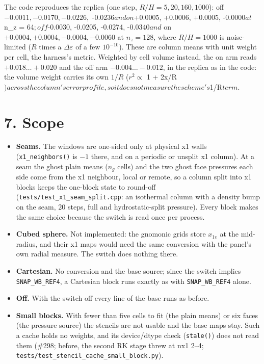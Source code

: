 \documentclass[11pt,a4paper]{article}
\begin{document}
The code reproduces the replica (one step, $R/H = 5, 20, 160, 1000$): off $-0.0011, -0.0170, -0.0226,$
-0.0236$ and on $+0.0005, +0.0006, +0.0005, -0.0000$ at $n\_z = 64$; off $-0.0030, -0.0205, -0.0274, -0.0340$ and$
on $+0.0004, +0.0004, -0.0004, -0.0060$ at $n_z = 128$, where $R/H = 1000$ is noise-limited ($R$ times a
$\Delta\varepsilon$ of a few $10^{-10}$). These are column means with unit weight per cell, the harness's
metric. Weighted by cell volume instead, the on arm reads $+0.018 \ldots +0.020$ and the off arm
$-0.004 \ldots -0.012$, in the replica as in the code: the volume weight carries its own $1/R$ ($r^2 \propto$
1 + 2x/R$) across the column's error profile, so it does not measure the scheme's $1/R$ term.$

\section*{7. Scope}

\begin{itemize}
\item \textbf{Seams.} The windows are one-sided only at physical x1 walls (\texttt{x1\_neighbors()} is $-1$ there, and on a
  periodic or unsplit x1 column). At a seam the ghost plain means ($n_g$ cells) and the two ghost face
  pressures each side come from the x1 neighbour, local or remote, so a column split into x1 blocks keeps the
  one-block state to round-off (\texttt{tests/test\_x1\_seam\_split.cpp}: an isothermal column with a density bump on
  the seam, 20 steps, full and hydrostatic-split pressure). Every block makes the same choice because the
  switch is read once per process.
\item \textbf{Cubed sphere.} Not implemented: the gnomonic grids store $x_{1v}$ at the mid-radius, and their x1 maps
  would need the same conversion with the panel's own radial measure. The switch does nothing there.
\item \textbf{Cartesian.} No conversion and the base source; since the switch implies \texttt{SNAP\_WB\_REF4}, a Cartesian block
  runs exactly as with \texttt{SNAP\_WB\_REF4} alone.
\item \textbf{Off.} With the switch off every line of the base runs as before.
\item \textbf{Small blocks.} With fewer than five cells to fit (the plain means) or six faces (the pressure source) the
  stencils are not usable and the base maps stay. Such a cache holds no weights, and its device/dtype check
  (\texttt{stale()}) does not read them (\#298; before, the second RK stage threw at nx1 2–4;
  \texttt{tests/test\_stencil\_cache\_small\_block.py}).
\end{itemize}
\end{document}
